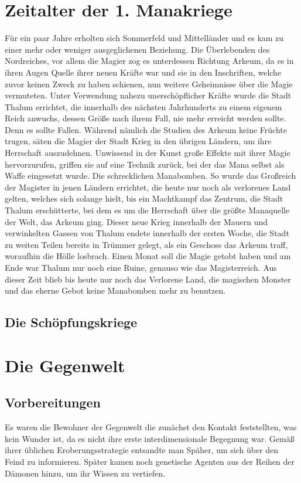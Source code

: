 \documentclass[a4paper,12pt,oneside]{book}
\begin{document}
\chapter{Zeitalter der 1. Manakriege}
Für ein paar Jahre erholten sich Sommerfeld und Mittelländer und es kam zu einer mehr oder weniger ausgeglichenen Beziehung. Die Überlebenden des Nordreiches, vor allem die Magier zog es unterdessen Richtung Arkeum, da es in ihren Augen Quelle ihrer neuen Kräfte war und sie in den Inschriften, welche zuvor keinen Zweck zu haben schienen, nun weitere Geheimnisse über die Magie vermuteten. Unter Verwendung nahezu unerschöpflicher Kräfte wurde die Stadt Thalum errichtet, die innerhalb des nächsten Jahrhunderts zu einem eigenem Reich anwuchs, dessen Größe nach ihrem Fall, nie mehr erreicht werden sollte. Denn es sollte Fallen. Während nämlich die Studien des Arkeum keine Früchte trugen, säten die Magier der Stadt Krieg in den übrigen Ländern, um ihre Herrschaft auszudehnen. Unwissend in der Kunst große Effekte mit ihrer Magie hervorzurufen, griffen sie auf eine Technik zurück, bei der das Mana selbst als Waffe eingesetzt wurde. Die schrecklichen Manabomben. So wurde das Großreich der Magister in jenen Ländern errichtet, die heute nur noch als verlorenes Land gelten, welches sich solange hielt, bis ein Machtkampf das Zentrum, die Stadt Thalum erschütterte, bei dem es um die Herrschaft über die größte Manaquelle der Welt, das Arkeum ging. Dieser neue Krieg innerhalb der Mauern und verwinkelten Gassen von Thalum endete innerhalb der ersten Woche, die Stadt zu weiten Teilen bereits in Trümmer gelegt, als ein Geschoss das Arkeum traff, woraufhin die Hölle losbrach. Einen Monat soll die Magie getobt haben und am Ende war Thalum nur noch eine Ruine, genauso wie das Magisterreich. Aus dieser Zeit blieb bis heute nur noch das Verlorene Land, die magischen Monster und das eherne Gebot keine Manabomben mehr zu benutzen. 
\section{Die Schöpfungskriege}
\chapter{Die Gegenwelt}
\section{Vorbereitungen}
Es waren die Bewohner der Gegenwelt die zunächst den Kontakt feststellten, was kein Wunder ist, da es nicht ihre erste interdimensionale Begegnung war. Gemäß ihrer üblichen Eroberungsstrategie entsandte man Späher, um sich über den Feind zu informieren. Später kamen noch genetische Agenten aus der Reihen der Dämonen hinzu, um ihr Wissen zu vertiefen. 
\end{document}
